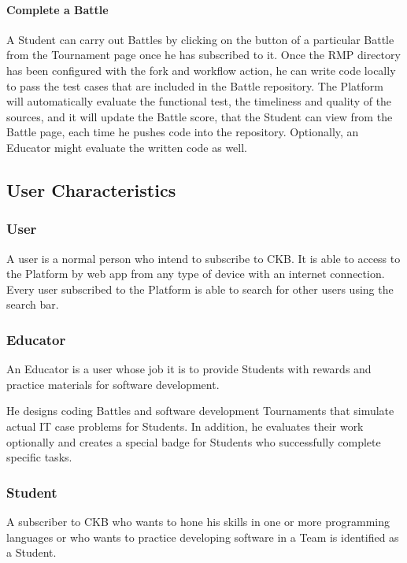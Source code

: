 \paragraph{Complete a Battle}
A Student can carry out Battles by clicking on the button of a particular Battle from the Tournament page once he has subscribed to it. Once the RMP directory has been configured with the fork and workflow action, he can write code 
locally to pass the test cases that are included in the Battle repository. The Platform will automatically evaluate the functional test, the timeliness and quality of the sources, and it will update the Battle score, that the Student 
can view from the Battle page, each time he pushes code into the repository. Optionally, an Educator might evaluate the written code as well.

\subsection{User Characteristics}
\subsubsection{User}
A user is a normal person who intend to subscribe to CKB. It is able to access to the Platform by web app from any type of device with an internet connection.\\
Every user subscribed to the Platform is able to search for other users using the search bar.

\subsubsection{Educator}
An Educator is a user whose job it is to provide Students with rewards and practice materials for software development.

He designs coding Battles and software development Tournaments that simulate actual IT case problems for Students. In addition, he evaluates their work optionally and creates a special badge for Students who successfully complete 
specific tasks.

\subsubsection{Student}
A subscriber to CKB who wants to hone his skills in one or more programming languages or who wants to practice developing software in a Team is identified as a Student.

